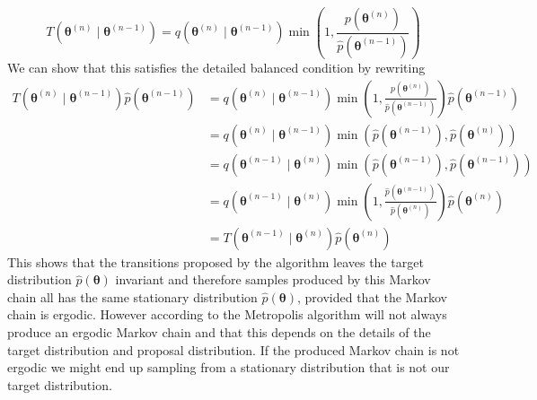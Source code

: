 \begin{equation*}
    T\left(\boldsymbol{\theta}^{(n)} \mid \boldsymbol{\theta}^{(n-1)}\right)=q\left(\boldsymbol{\theta}^{(n)} \mid \boldsymbol{\theta}^{(n-1)}\right) \min \left(1, \frac{p\left(\boldsymbol{\theta}^{(n)}\right)}{ \hat{p}(\boldsymbol{\theta}^{(n-1)})}\right)
\end{equation*}
We can show that this satisfies the detailed balanced condition by rewriting
\begin{equation*}
\begin{aligned}
T\left(\boldsymbol{\theta}^{(n)} \mid \boldsymbol{\theta}^{(n-1)}\right) \hat{p}(\boldsymbol{\theta}^{(n-1)}) &=q\left(\boldsymbol{\theta}^{(n)} \mid \boldsymbol{\theta}^{(n-1)}\right) \min \left(1,\frac{ p\left(\boldsymbol{\theta}^{(n)}\right) }{ \hat{p}(\boldsymbol{\theta}^{(n-1)})}\right) \hat{p}(\boldsymbol{\theta}^{(n-1)}) \\
&=q\left(\boldsymbol{\theta}^{(n)} \mid \boldsymbol{\theta}^{(n-1)}\right) \min \left(\hat{p}(\boldsymbol{\theta}^{(n-1)}), \hat{p}\left(\boldsymbol{\theta}^{(n)}\right)\right) \\
&=q\left(\boldsymbol{\theta}^{(n-1)} \mid \boldsymbol{\theta}^{(n)}\right) \min \left(\hat{p}\left(\boldsymbol{\theta}^{(n-1)}\right), \hat{p}(\boldsymbol{\theta}^{(n-1)})\right) \\
&=q\left(\boldsymbol{\theta}^{(n-1)} \mid \boldsymbol{\theta}^{(n)}\right) \min \left(1, \frac{\hat{p}(\boldsymbol{\theta}^{(n-1)}) }{ \hat{p}\left(\boldsymbol{\theta}^{(n)}\right)}\right) \hat{p}\left(\boldsymbol{\theta}^{(n)}\right) \\
&=T\left(\boldsymbol{\theta}^{(n-1)} \mid \boldsymbol{\theta}^{(n)}\right) \hat{p}\left(\boldsymbol{\theta}^{(n)}\right)
\end{aligned}
\end{equation*}
This shows that the transitions proposed by the algorithm leaves the target distribution $\hat{p}(\boldsymbol{\theta})$ invariant and therefore samples produced by this Markov chain all has the same stationary distribution $\hat{p}(\boldsymbol{\theta})$, provided that the Markov chain is ergodic. However according to \cite{neal2012bayesian} the Metropolis algorithm will not always produce an ergodic Markov chain and that this depends on the details of the target distribution and proposal distribution. If the produced Markov chain is not ergodic we might end up sampling from a stationary distribution that is not our target distribution.
\\
\\
